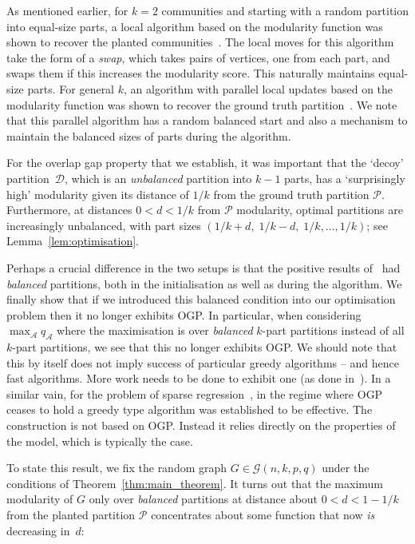 \documentclass[a4paper,UKenglish,cleveref, autoref, thm-restate,numberwithinsect]{lipics-v2021}
\newcommand{\cA}{\mathcal{A}}
\newcommand{\cD}{\mathcal{D}}
\newcommand{\cP}{\mathcal{P}}
\newcommand{\Fc}{
}
\begin{document}
As mentioned earlier, for $k=2$ communities and starting with a random partition into equal-size parts, a local algorithm based on the modularity function was shown to recover the planted communities~\cite{cohen2020power}. The local moves for this algorithm take the form of a \emph{swap}, which takes pairs of vertices, one from each part, and swaps them if this increases the modularity score. This naturally maintains equal-size parts.  
For general $k$, an algorithm with parallel local updates based on the modularity function was shown to recover the ground truth partition~\cite{cohen2022massively}. We note that this parallel algorithm has a random balanced start and also a mechanism to maintain the balanced sizes of parts during the algorithm.


For the overlap gap property that we establish, it was important that the `decoy' partition~$\cD$, which is an {\em unbalanced} partition into $k-1$ parts, has a `surprisingly high' modularity given its distance of $1/k$ from the ground truth partition $\cP$. Furthermore, at distances $0<d<1/k$ from $\cP$ modularity, optimal partitions are increasingly unbalanced, with part sizes $(1/k+d, \; 1/k-d, \; 1/k, \ldots, 1/k )$; see Lemma~\ref{lem:optimisation}. 


Perhaps a crucial difference in the two setups is that the positive results of~\cite{cohen2020power, cohen2022massively} had {\em balanced} partitions, both in the initialisation as well as during the algorithm. We finally show that if we introduced this balanced condition into our optimisation problem then it no longer exhibits OGP. In particular, when considering $\max_{\cA} q_{\cA}$ where the maximisation is over \emph{balanced} $k$-part partitions instead of all $k$-part partitions, we see that this no longer exhibits OGP.  
We should note that this by itself does not imply  
{\Fc success of particular greedy algorithms -- and hence fast algorithms.}
More work needs to be done to exhibit one {(as done in~\cite{cohen2020power,cohen2022massively})}. In a similar vain, for the problem of sparse regression~\cite{gamarnik2022sparse}, in the regime where OGP ceases to hold a greedy type algorithm was established to be effective. The construction is not based on OGP. Instead it relies directly on the properties of the model, which is typically the case.

To state this result, we fix the random graph $G \in \mathcal{G}(n,k,p,q)$ under the conditions of Theorem~\ref{thm:main_theorem}. It turns out that the maximum modularity of $G$ only over \emph{balanced} partitions at distance about $0<d<1-1/k$ from the planted partition $\cP$ concentrates about some function that now {\em is} decreasing in~$d$:
\end{document}
